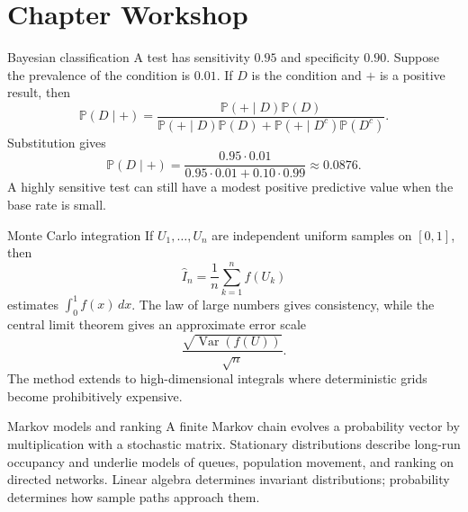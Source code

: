 \section{Chapter Workshop}

\begin{workedexample}{Bayesian classification}
A test has sensitivity $0.95$ and specificity $0.90$. Suppose the prevalence of the condition is $0.01$. If $D$ is the condition and $+$ is a positive result, then
\[
\mathbb{P}(D\mid +)
=\frac{\mathbb{P}(+\mid D)\mathbb{P}(D)}
{\mathbb{P}(+\mid D)\mathbb{P}(D)+\mathbb{P}(+\mid D^c)\mathbb{P}(D^c)}.
\]
Substitution gives
\[
\mathbb{P}(D\mid +)=\frac{0.95\cdot0.01}{0.95\cdot0.01+0.10\cdot0.99}\approx0.0876.
\]
A highly sensitive test can still have a modest positive predictive value when the base rate is small.
\end{workedexample}

\begin{applicationbox}{Monte Carlo integration}
If $U_1,\dots,U_n$ are independent uniform samples on $[0,1]$, then
\[
    \widehat I_n=\frac1n\sum_{k=1}^n f(U_k)
\]
estimates $\int_0^1f(x)\,dx$. The law of large numbers gives consistency, while the central limit theorem gives an approximate error scale
\[
    \frac{\sqrt{\operatorname{Var}(f(U))}}{\sqrt n}.
\]
The method extends to high-dimensional integrals where deterministic grids become prohibitively expensive.
\end{applicationbox}

\begin{applicationbox}{Markov models and ranking}
A finite Markov chain evolves a probability vector by multiplication with a stochastic matrix. Stationary distributions describe long-run occupancy and underlie models of queues, population movement, and ranking on directed networks. Linear algebra determines invariant distributions; probability determines how sample paths approach them.
\end{applicationbox}

